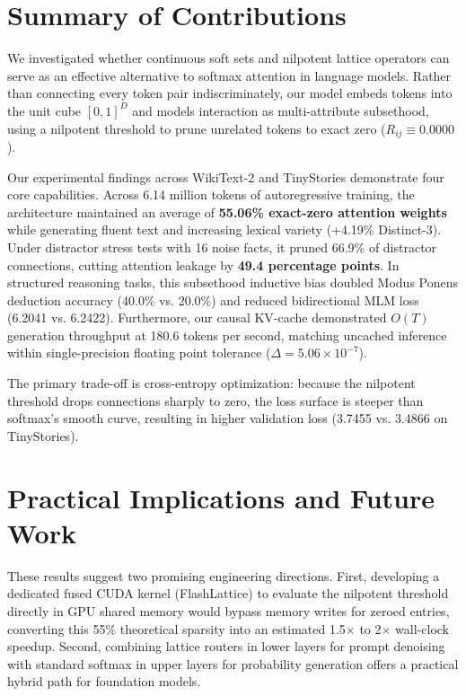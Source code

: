 \label{chap:conclusion}

\section{Summary of Contributions}
We investigated whether continuous soft sets and nilpotent lattice operators can serve as an effective alternative to softmax attention in language models. Rather than connecting every token pair indiscriminately, our model embeds tokens into the unit cube $[0, 1]^D$ and models interaction as multi-attribute subsethood, using a nilpotent threshold to prune unrelated tokens to exact zero ($R_{ij} \equiv 0.0000$).

Our experimental findings across WikiText-2 and TinyStories demonstrate four core capabilities. Across 6.14 million tokens of autoregressive training, the architecture maintained an average of \textbf{55.06\% exact-zero attention weights} while generating fluent text and increasing lexical variety (+4.19\% Distinct-3). Under distractor stress tests with 16 noise facts, it pruned 66.9\% of distractor connections, cutting attention leakage by \textbf{49.4 percentage points}. In structured reasoning tasks, this subsethood inductive bias doubled Modus Ponens deduction accuracy (40.0\% vs. 20.0\%) and reduced bidirectional MLM loss (6.2041 vs. 6.2422). Furthermore, our causal KV-cache demonstrated $O(T)$ generation throughput at 180.6 tokens per second, matching uncached inference within single-precision floating point tolerance ($\Delta = 5.06 \times 10^{-7}$).

The primary trade-off is cross-entropy optimization: because the nilpotent threshold drops connections sharply to zero, the loss surface is steeper than softmax's smooth curve, resulting in higher validation loss (3.7455 vs. 3.4866 on TinyStories).

\section{Practical Implications and Future Work}
These results suggest two promising engineering directions. First, developing a dedicated fused CUDA kernel (FlashLattice) to evaluate the nilpotent threshold directly in GPU shared memory would bypass memory writes for zeroed entries, converting this 55\% theoretical sparsity into an estimated 1.5$\times$ to 2$\times$ wall-clock speedup. Second, combining lattice routers in lower layers for prompt denoising with standard softmax in upper layers for probability generation offers a practical hybrid path for foundation models.
